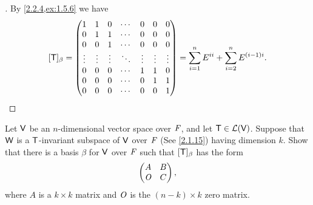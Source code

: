 \begin{proof}[]
  By \cref{2.2.4,ex:1.5.6} we have
  \[
    [\mathsf{T}]_{\beta} = \begin{pmatrix}
      1      & 1      & 0      & \cdots & 0      & 0      & 0      \\
      0      & 1      & 1      & \cdots & 0      & 0      & 0      \\
      0      & 0      & 1      & \cdots & 0      & 0      & 0      \\
      \vdots & \vdots & \vdots & \ddots & \vdots & \vdots & \vdots \\
      0      & 0      & 0      & \cdots & 1      & 1      & 0      \\
      0      & 0      & 0      & \cdots & 0      & 1      & 1      \\
      0      & 0      & 0      & \cdots & 0      & 0      & 1
    \end{pmatrix} = \sum_{i = 1}^n E^{i i} + \sum_{i = 2}^n E^{(i - 1) i}.
  \]
\end{proof}

\begin{ex}\label{ex:2.2.11}
  Let \(\mathsf{V}\) be an \(n\)-dimensional vector space over \(\mathit{F}\), and let \(\mathsf{T} \in \mathcal{L}(\mathsf{V})\).
  Suppose that \(\mathsf{W}\) is a \(\mathsf{T}\)-invariant subspace of \(\mathsf{V}\) over \(\mathit{F}\) (See \cref{2.1.15}) having dimension \(k\).
  Show that there is a basis \(\beta\) for \(\mathsf{V}\) over \(\mathit{F}\) such that \([\mathsf{T}]_{\beta}\) has the form
  \[
    \begin{pmatrix}
      A   & B \\
      \mathit{O} & C
    \end{pmatrix},
  \]
  where \(A\) is a \(k \times k\) matrix and \(\mathit{O}\) is the \((n - k) \times k\) zero matrix.
\end{ex}

